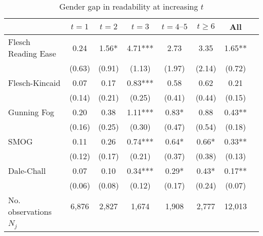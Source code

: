 \begin{table}
    \footnotesize
    \centering
    \begin{threeparttable}
        \caption{Gender gap in readability at increasing \(t\)}
        \label{table8}
        \begin{tabular}{p{3cm}S@{}S@{}S@{}S@{}S@{}S@{}S@{}}
            \toprule
            &{\(t=1\)}&{\(t=2\)}&{\(t=3\)}&{\(t=4\text{--}5\)}&{\(t\ge6\)}&{All}\\
            \midrule
            Flesch Reading Ease           &        0.24   &        1.56*  &        4.71***&        2.73   &        3.35   &        1.65** \\
                                          &      (0.63)   &      (0.91)   &      (1.13)   &      (1.97)   &      (2.14)   &      (0.72)   \\
            Flesch-Kincaid                &        0.07   &        0.17   &        0.83***&        0.58   &        0.62   &        0.21   \\
                                          &      (0.14)   &      (0.21)   &      (0.25)   &      (0.41)   &      (0.44)   &      (0.15)   \\
            Gunning Fog                   &        0.20   &        0.38   &        1.11***&        0.83*  &        0.88   &        0.43** \\
                                          &      (0.16)   &      (0.25)   &      (0.30)   &      (0.47)   &      (0.54)   &      (0.18)   \\
            SMOG                          &        0.11   &        0.26   &        0.74***&        0.64*  &        0.66*  &        0.33** \\
                                          &      (0.12)   &      (0.17)   &      (0.21)   &      (0.37)   &      (0.38)   &      (0.13)   \\
            Dale-Chall                    &        0.07   &        0.10   &        0.34***&        0.29*  &        0.43*  &        0.17** \\
                                          &      (0.06)   &      (0.08)   &      (0.12)   &      (0.17)   &      (0.24)   &      (0.07)   \\
            \midrule
            No. observations              &       6,876   &       2,827   &       1,674   &       1,908   &       2,777   &      12,013   \\
            \(N_j\)                       &           {}   &           {}   &           {}   &           {}   &           {}   &           {}   \\

\end{tabular}
\end{threeparttable}
\end{table}
